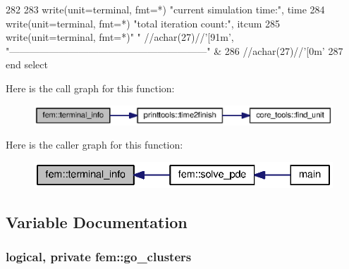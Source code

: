 \begin{DoxyCode}
282 
283           \textcolor{keyword}{write}(unit=terminal, fmt=*) \textcolor{stringliteral}{"current simulation time:"}, time
284           \textcolor{keyword}{write}(unit=terminal, fmt=*) \textcolor{stringliteral}{"total iteration count:"}, itcum
285           \textcolor{keyword}{write}(unit=terminal, fmt=*)\textcolor{stringliteral}{" "} //achar(27)//\textcolor{stringliteral}{'[91m'},  \textcolor{stringliteral}{
      "------------------------------------------------------------"}\textcolor{comment}{ &}
286 \textcolor{comment}{                                          //achar(27)//}\textcolor{stringliteral}{'[0m'}
287 \textcolor{keywordflow}{      end select}
\end{DoxyCode}


Here is the call graph for this function\+:\nopagebreak
\begin{figure}[H]
\begin{center}
\leavevmode
\includegraphics[width=350pt]{namespacefem_a9e77b74c31cc713c381da60bfd60b5ed_cgraph}
\end{center}
\end{figure}




Here is the caller graph for this function\+:\nopagebreak
\begin{figure}[H]
\begin{center}
\leavevmode
\includegraphics[width=332pt]{namespacefem_a9e77b74c31cc713c381da60bfd60b5ed_icgraph}
\end{center}
\end{figure}




\subsection{Variable Documentation}
\subsubsection[{go\+\_\+clusters}]{\setlength{\rightskip}{0pt plus 5cm}logical, private fem\+::go\+\_\+clusters\hspace{0.3cm}{\ttfamily [private]}}\label{namespacefem_af7b5250bf4204fa74229da3d3e59551e}


